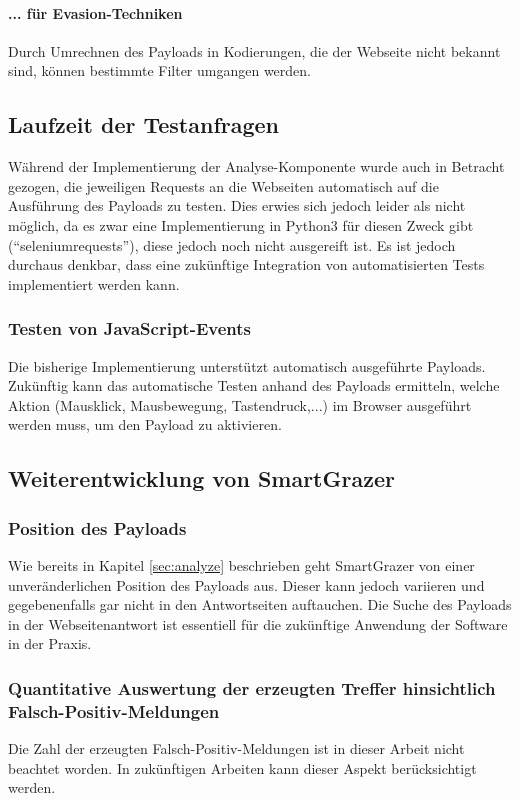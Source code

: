 \paragraph{... für Evasion-Techniken}
Durch Umrechnen des Payloads in Kodierungen, die der Webseite nicht bekannt sind, können bestimmte Filter umgangen werden.

\subsection{Laufzeit der Testanfragen}

Während der Implementierung der Analyse-Komponente wurde auch in Betracht gezogen, die jeweiligen Requests an die Webseiten automatisch auf die Ausführung des Payloads zu testen. Dies erwies sich jedoch leider als nicht möglich, da es zwar eine Implementierung in Python3 für diesen Zweck gibt (``seleniumrequests''), diese jedoch noch nicht ausgereift ist. Es ist jedoch durchaus denkbar, dass eine zukünftige Integration von automatisierten Tests implementiert werden kann.

\subsubsection{Testen von JavaScript-Events}

Die bisherige Implementierung unterstützt automatisch ausgeführte Payloads. Zukünftig kann das automatische Testen anhand des Payloads ermitteln, welche Aktion (Mausklick, Mausbewegung, Tastendruck,...) im Browser ausgeführt werden muss, um den Payload zu aktivieren.

\subsection{Weiterentwicklung von SmartGrazer}

\subsubsection{Position des Payloads}

Wie bereits in Kapitel \ref{sec:analyze} beschrieben geht SmartGrazer von einer unveränderlichen Position des Payloads aus. Dieser kann jedoch variieren und gegebenenfalls gar nicht in den Antwortseiten auftauchen. Die Suche des Payloads in der Webseitenantwort ist essentiell für die zukünftige Anwendung der Software in der Praxis.

\subsubsection{Quantitative Auswertung der erzeugten Treffer hinsichtlich Falsch-Positiv-Meldungen}
Die Zahl der erzeugten Falsch-Positiv-Meldungen ist in dieser Arbeit nicht beachtet worden. In zukünftigen Arbeiten kann dieser Aspekt berücksichtigt werden.

